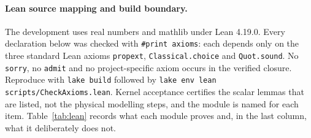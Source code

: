 \documentclass[11pt,a4paper]{article}
\theoremstyle{plain}
\theoremstyle{definition}
\theoremstyle{remark}
\begin{document}
\paragraph{Lean source mapping and build boundary.}
The development uses real numbers and mathlib under Lean 4.19.0. Every
declaration below was checked with \texttt{\#print axioms}: each depends only on
the three standard Lean axioms \texttt{propext}, \texttt{Classical.choice} and
\texttt{Quot.sound}. No \texttt{sorry}, no \texttt{admit} and no
project-specific axiom occurs in the verified closure. Reproduce with
\texttt{lake build} followed by
\texttt{lake env lean scripts/CheckAxioms.lean}. Kernel acceptance certifies the
scalar lemmas that are listed, not the physical modelling steps, and the module
is named for each item. Table~\ref{tab:lean} records what each module proves and,
in the last column, what it deliberately does not.
\end{document}

